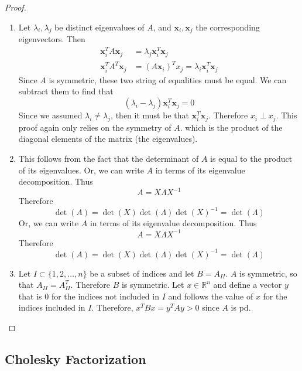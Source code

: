\documentclass[12pt]{article}
\theoremstyle{definition}
\newcommand{\R}{\mathbb{R}}
\newcommand{\x}{\bm{x}}
\theoremstyle{definition}
\begin{document}
\begin{proof}
\begin{enumerate}
	\item Let $\lambda_i, \lambda_j$ be distinct eigenvalues of $A$, and $\x_i, \x_j$ the corresponding eigenvectors. Then
	\begin{align*}
		\x_i^T A \x_j &= \lambda_j \x_i^T \x_j \\
		\x_i^T A^T \x_j &= (A\x_i)^T x_j = \lambda_i \x_i^T \x_j 
	\end{align*}
	Since $A$ is symmetric, these two string of equalities must be equal. We can subtract them to find that 
	\begin{equation}
		(\lambda_i - \lambda_j)\x_i^T \x_j = 0
	\end{equation}
	Since we assumed $\lambda_i \neq \lambda_j$, then it must be that $\x_i^T \x_j$. Therefore $x_i \perp x_j$. This proof again only relies on the symmetry of $A$. 
 	which is the product of the diagonal elements of the matrix (the eigenvalues). 
	\item This follows from the fact that the determinant of $A$ is equal to the product of its eigenvalues. Or, we can write $A$ in terms of its eigenvalue decomposition. Thus
	\begin{equation}
		A = X \Lambda X^{-1}
	\end{equation}
	Therefore
	\begin{equation}
		\det(A) = \det(X) \det(\Lambda) \det(X)^{-1} = \det(\Lambda) 
 	\end{equation}Or, we can write $A$ in terms of its eigenvalue decomposition. Thus
	\begin{equation}
		A = X \Lambda X^{-1}
	\end{equation}
	Therefore
	\begin{equation}
		\det(A) = \det(X) \det(\Lambda) \det(X)^{-1} = \det(\Lambda) 
 	\end{equation}
	\item Let $I \subset \{1,2,\ldots, n\}$ be a subset of indices and let $B = A_{II}$. $A$ is symmetric, so that $A_{II} = A_{II}^T$. Therefore $B$ is symmetric. Let $x \in \R^n$ and define a vector $y$ that is $0$ for the indices not included in $I$ and follows the value of $x$ for the indices included in $I$. Therefore, $x^TBx = y^TAy > 0$ since $A$ is pd. 
\end{enumerate}
\end{proof}

\subsection{Cholesky Factorization}
\end{document}
